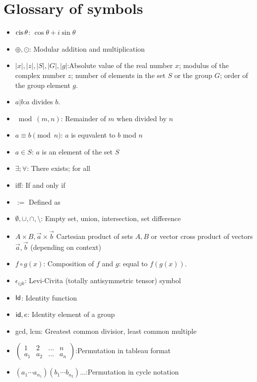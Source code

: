 \chapter*{Glossary of symbols}

\begin{itemize}
\item[]
$\operatorname{cis} \theta$: \quad $\cos \theta + i \sin \theta$
\item[]
$\oplus, \odot$: \quad Modular addition and multiplication
\item[]
$|x|,|z|,|S|,|G|,|g|$:\quad Absolute value of the real number $x$; modulus of the complex number $z$; number of elements in the set $S$ or the group $G$; order of the group element $g$. 
\item[]
$a | b$:\quad $a$ divides $b$.
\item[]
 $\bmod(m,n)$: \quad Remainder of $m$ when divided by $n$
\item[]
$a \equiv b \pmod n $: \quad $a$ is equvalent to $b$ mod $n$
\item[]
$a \in S$: \quad $a$ is an element of the set $S$
\item[]
$\exists; \forall$: \quad There exists; for all
\item[]
iff: \quad If and only if
\item[]
$:=$ \quad Defined as
\item[]
$\emptyset, \cup, \cap, \setminus$: \quad Empty set, union, intersection, set difference
\item[]
$A\times B, \vec{a} \times \vec{b}$ \quad Cartesian product of sets $A,B$ or vector cross product of vectors $\vec{a},\vec{b}$ (depending on context)
\item[]
$f \circ g(x)$: \quad Composition of $f$ and $g$: equal to $f(g(x))$.
\item[]
$\epsilon_{ijk}$: \quad Levi-Civita (totally antisymmetric tensor) symbol
\item[]
${\sf{I}d}$: \quad Identity function
\item[]
${\sf{i}d}, e$: \quad Identity element of a group
\item[]
gcd, lcm: \quad Greatest common divisior, least common multiple
\item[]
$\begin{pmatrix} 1 & 2 & \ldots & n\\ a_1 & a_2 & \ldots & a_n \end{pmatrix}$:\quad Permutation in tableau format
\item[]
$(a_1 \cdots a_{n_1})(b_1 \cdots b_{n_2}) \ldots $:\quad Permutation in cycle notation

\end{itemize}
